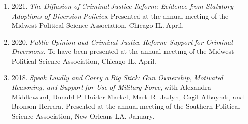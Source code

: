 \documentclass[margin,line,pifont,palatino,courier]{res}
\begin{document}
\begin{resume}
\begin{enumerate}
\item 2021. \emph{The Diffusion of Criminal Justice Reform: Evidence
    from Statutory Adoptions of Diversion Policies}. Presented at
  the annual meeting of the Midwest Political Science Association,
  Chicago IL. April.

\item 2020. \emph{Public Opinion and Criminal Justice Reform: Support for
  Criminal Diversions}. To have been presented at the annual meeting of
the Midwest Political Science Association, Chicago IL. April.

\item 2018. \emph{Speak Loudly and Carry a Big Stick: Gun Ownership, Motivated
  Reasoning, and Support for Use of Military Force}, with Alexandra
Middlewood, Donald P. Haider-Markel, Mark R. Joslyn, Cagil Albayrak,
and Bronson Herrera. Presented at the annual meeting of the Southern
Political Science Association, New Orleans LA. January.
\end{enumerate}








\end{resume}
\end{document}

